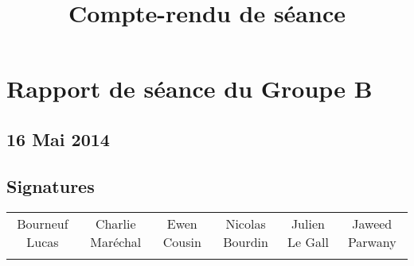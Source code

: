 
\title{Compte-rendu de séance}
\author{}
\date{} 

\pagestyle{empty} 
\pagestyle{fancy} 







\chapter*{Rapport de séance du Groupe B}	
\section*{16 Mai 2014}
	\vspace{12.1cm}


\section*{Signatures}

    	\begin{tabular*}{0.75\textwidth}{c | c | c | c | c | c}
    	    Bourneuf Lucas & Charlie Maréchal & Ewen Cousin & Nicolas Bourdin & Julien Le Gall & Jaweed Parwany\\
     	     & & & & &
    	\end{tabular*}





